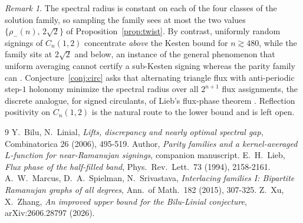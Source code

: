 \documentclass[11pt]{article}
\theoremstyle{remark}
\newtheorem{remark}[lemma]{Remark}
\begin{document}
\begin{remark}
The spectral radius is constant on each of the four classes of the
solution family, so sampling the family sees at most the two values
$\{\rho_-(n),\,2\sqrt2\}$ of Proposition~\ref{prop:twist}. By contrast, uniformly random signings of $C_n(1,2)$
concentrate \emph{above} the Kesten bound for $n\gtrsim480$, while the
family sits at $2\sqrt2$ and below, an instance of the general
phenomenon that uniform averaging cannot certify a sub-Kesten signing
whereas the parity family can \cite{companionA}.
Conjecture~\ref{conj:circ} asks that alternating triangle flux with
anti-periodic step-$1$ holonomy minimize the spectral radius over all
$2^{n+1}$ flux assignments, the discrete analogue, for signed
circulants, of Lieb's flux-phase theorem \cite{lieb94}. Reflection
positivity on $C_n(1,2)$ is the natural route to the lower bound and
is left open.
\end{remark}

\begin{thebibliography}{9}
 Y.~Bilu, N.~Linial,
\emph{Lifts, discrepancy and nearly optimal spectral gap},
Combinatorica 26 (2006), 495-519.
 Author, \emph{Parity families and a
kernel-averaged $L$-function for near-Ramanujan signings}, companion
manuscript.
 E.~H.~Lieb, \emph{Flux phase of the half-filled band},
Phys.~Rev.~Lett.~73 (1994), 2158-2161.
 A.~W.~Marcus, D.~A.~Spielman, N.~Srivastava,
\emph{Interlacing families I: Bipartite Ramanujan graphs of all
degrees}, Ann.~of Math.~182 (2015), 307-325.
 Z.~Xu, X.~Zhang, \emph{An improved upper bound for
the Bilu-Linial conjecture}, arXiv:2606.28797 (2026).
\end{thebibliography}
\end{document}
